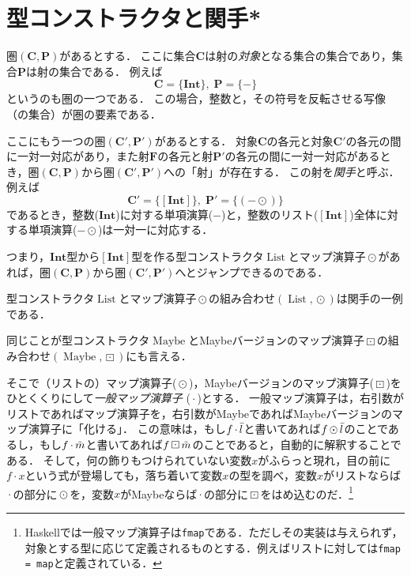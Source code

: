\documentclass[twocolumn]{jsbook}
\newcommand{\keyword}[1]{{\emph{#1}}}
\newcommand{\code}[1]{\texttt{#1}}
\newcommand{\hsklType}[1]{\textbf{#1}}
\newcommand{\hsklTypeConstructor}[1]{\mathop{\mathrm{#1}}}
\DeclareMathOperator{\hsklFmap}{\cdot}
\DeclareMathOperator{\hsklListConstructor}{\hsklTypeConstructor{List}}
\DeclareMathOperator{\hsklMap}{\odot}
\DeclareMathOperator{\hsklMaybeConstructor}{\hsklTypeConstructor{Maybe}}
\DeclareMathOperator{\hsklMaybeMap}{\boxdot}
\newcommand{\hsklInt}{\hsklType{Int}}
\newcommand{\hsklList}[1]{\Bar{#1}}
\newcommand{\hsklListType}[1]{[#1]}
\newcommand{\hsklMaybe}[1]{\Tilde{#1}}
\newcommand{\mathSet}[1]{\mathbf{#1}}
\newcommand{\mathCategoryShort}[2]{(#1,#2)}
\begin{document}
\section{型コンストラクタと関手*}

圏$\mathCategoryShort{\mathSet{C}}{\mathSet{P}}$があるとする．
ここに集合$\mathSet{C}$は射の\keyword{対象}となる集合の集合であり，集合$\mathSet{P}$は射の集合である．
例えば$$\mathSet{C}=\{\hsklInt\},\;\mathSet{P}=\{-\}$$というのも圏の一つである．
この場合，整数と，その符号を反転させる写像（の集合）が圏の要素である．

ここにもう一つの圏$\mathCategoryShort{\mathSet{C}'}{\mathSet{P}'}$があるとする．
対象$\mathSet{C}$の各元と対象$\mathSet{C}'$の各元の間に一対一対応があり，また射$\mathSet{F}$の各元と射$\mathSet{P}'$の各元の間に一対一対応があるとき，圏$\mathCategoryShort{\mathSet{C}}{\mathSet{P}}$から圏$\mathCategoryShort{\mathSet{C}'}{\mathSet{P}'}$への「射」が存在する．
この射を\keyword{関手}と呼ぶ．
例えば$$\mathSet{C}'=\{\hsklListType{\hsklInt}\},\;\mathSet{P}'=\{(-\hsklMap)\}$$であるとき，整数($\hsklInt$)に対する単項演算($-$)と，整数のリスト($\hsklListType{\hsklInt}$)全体に対する単項演算($-\hsklMap$)は一対一に対応する．

つまり，$\hsklInt$型から$\hsklListType{\hsklInt}$型を作る型コンストラクタ$\hsklListConstructor$とマップ演算子$\hsklMap$があれば，圏$\mathCategoryShort{\mathSet{C}}{\mathSet{P}}$から圏$\mathCategoryShort{\mathSet{C}'}{\mathSet{P}'}$へとジャンプできるのである．

型コンストラクタ$\hsklListConstructor$とマップ演算子$\hsklMap$の組み合わせ$(\hsklListConstructor,\hsklMap)$は関手の一例である．

同じことが型コンストラクタ$\hsklMaybeConstructor$とMaybeバージョンのマップ演算子$\hsklMaybeMap$の組み合わせ$(\hsklMaybeConstructor,\hsklMaybeMap)$にも言える．

そこで（リストの）マップ演算子($\hsklMap$)，Maybeバージョンのマップ演算子($\hsklMaybeMap$)をひとくくりにして\keyword{一般マップ演算子} ($\hsklFmap$)とする．
一般マップ演算子は，右引数がリストであればマップ演算子を，右引数がMaybeであればMaybeバージョンのマップ演算子に「化ける」．
この意味は，もし$f\hsklFmap\hsklList{l}$と書いてあれば$f\hsklMap\hsklList{l}$のことであるし，もし$f\hsklFmap\hsklMaybe{m}$と書いてあれば$f\hsklMaybeMap\hsklMaybe{m}$のことであると，自動的に解釈することである．
そして，何の飾りもつけられていない変数$x$がふらっと現れ，目の前に$f\hsklFmap x$という式が登場しても，落ち着いて変数$x$の型を調べ，変数$x$がリストならば$\hsklFmap$の部分に$\hsklMap$を，変数$x$がMaybeならば$\hsklFmap$の部分に$\hsklMaybeMap$をはめ込むのだ．\footnote{Haskellでは一般マップ演算子は\code{fmap}である．ただしその実装は与えられず，対象とする型に応じて定義されるものとする．例えばリストに対しては\code{fmap = map}と定義されている．}
\end{document}
